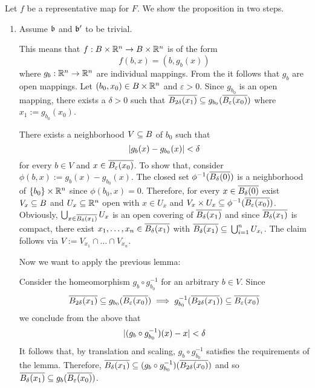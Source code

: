 \begin{myproof}
    Let $f$ be a representative map for $F$.
    We show the proposition in two steps.
    \begin{enumerate}
        \item
        Assume $\mathfrak{b}$ and $\mathfrak{b}'$ to be trivial.

        This means that $f: B \times \mathbb{R}^n \to B \times \mathbb{R}^n$ is of the form
        \[ f(b, x) = (b, g_b(x)) \]
        where $g_b: \mathbb{R}^n \to \mathbb{R}^n$ are individual mappings.
        From the  it follows that $g_b$ are open mappings.
        Let $(b_0, x_0) \in B \times \mathbb{R}^n$ and $\varepsilon > 0$.
        Since $g_{b_0}$ is an open mapping, there exists a $\delta > 0$ such that
        $\clball[2\delta][x_1] \sub g_{b_0}(\clball[\varepsilon][x_0])$ where $x_1 := g_{b_0}(x_0)$.

        There exists a neighborhood $V \subseteq{} B$ of $b_0$ such that
        \[ \vert{} g_b(x) - g_{b_0}(x) \vert{} < \delta \]
        for every $b \in V$ and $x \in \clball[\varepsilon][x_0]$.
        To show that, consider $\phi(b, x) := g_b(x) - g_{b_0}(x)$.
        The closed set $\phi^{-1}(\clball[\delta])$ is a neighborhood of $\{b_0\} \times \mathbb{R}^n$ since $\phi(b_0, x) = 0$.
        Therefore, for every $x \in \clball[\delta]$ exist $V_x \subseteq{} B$ and $U_x \subseteq{} \mathbb{R}^n$ open with $x \in U_x$ and $V_x \times U_x \sub \phi^{-1}(\clball[\varepsilon][x_0])$.
        Obviously, $\bigcup_{x \in \clball[\delta][x_1]} U_x$ is an open covering of $\clball[\delta][x_1]$ and since $\clball[\delta][x_1]$ is compact,
        there exist $x_1, \dots, x_n \in \clball[\delta][x_1]$ with $\clball[\delta][x_1] \sub \bigcup_{i = 1}^{n} U_{x_i}$.
        The claim follows via $V := V_{x_1} \cap \dots \cap V_{x_n}$.

        Now we want to apply the previous lemma:

        Consider the homeomorphism $g_b \circ g_{b_0}^{-1}$ for an arbitrary $b \in V$.
        Since
        \[ \clball[2\delta][x_1] \sub g_{b_0}(\clball[\varepsilon][x_0]) \implies g_{b_0}^{-1}(\clball[2\delta][x_1]) \sub \clball[\varepsilon][x_0] \]
        we conclude from the above that
        \[ \vert{} (g_b \circ g_{b_0}^{-1})(x) - x \vert{} < \delta \]
        It follows that, by translation and scaling, $g_b \circ g_{b_0}^{-1}$ satisfies the requirements of the lemma.
        Therefore, $\clball[\delta][x_1] \sub (g_b \circ g_{b_0}^{-1})(\clball[2\delta][x_0])$ and so $\clball[\delta][x_1] \sub g_b(\clball[\varepsilon][x_0])$.


\end{enumerate}
\end{myproof}
